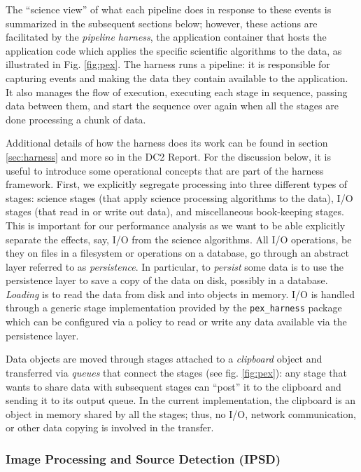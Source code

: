 The ``science view'' of what each pipeline does in response to these
events is summarized in the subsequent sections below; however, these
actions are facilitated by the \textit{pipeline harness}, the
application container that hosts the application code which applies
the specific scientific algorithms to the data, as illustrated in
Fig. \ref{fig:pex}.  The harness runs a pipeline: it is responsible
for capturing events and making the data they contain available to the
application.  It also manages the flow of execution, executing each
stage in sequence, passing data between them, and start the sequence
over again when all the stages are done processing a chunk of data.  

Additional details of how the harness does its work can be found in
section \ref{sec:harness} and more so in the DC2 Report.  For the
discussion below, it is useful to introduce some operational concepts
that are part of the harness framework.  First, we explicitly
segregate processing into three different types of stages:  science
stages (that apply science processing algorithms to the data), I/O
stages (that read in or write out data), and miscellaneous
book-keeping stages.  This is important for our performance analysis
as we want to be able explicitly separate the effects, say, I/O from
the science algorithms.  All I/O operations, be they on files in a
filesystem or operations on a database, go through an abstract
layer referred to as \textit{persistence}.  In particular, to
\textit{persist} some data is to use the persistence layer to save a
copy of the data on disk, possibly in a database.  \textit{Loading} is to
read the data from disk and into objects in memory.  I/O is handled
through a generic stage implementation provided by the
\texttt{pex\_harness} package which can be configured via a policy to
read or write any data available via the persistence layer.  

Data objects are moved through stages attached to a \textit{clipboard}
object and transferred via \textit{queues} that connect the stages
(see fig. \ref{fig:pex}): any stage that wants to share data with
subsequent stages can ``post'' it to the clipboard and sending it to
its output queue.  In the current implementation, the clipboard is an
object in memory shared by all the stages; thus, no I/O, network
communication, or other data copying is involved in the transfer.

\subsubsection{Image Processing and Source Detection (IPSD)}

